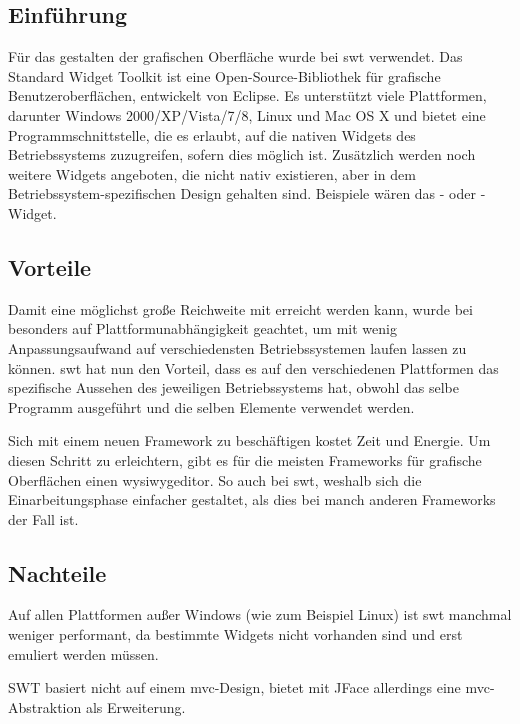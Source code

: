 \subsection{Einführung}
Für das gestalten der grafischen Oberfläche wurde bei \sblit \acrshort{swt} verwendet.
Das Standard Widget Toolkit ist eine Open-Source-Bibliothek für grafische
Benutzeroberflächen, entwickelt von Eclipse. Es unterstützt viele Plattformen,
darunter Windows 2000/XP/Vista/7/8, Linux und Mac OS X und bietet eine
Programmschnittstelle, die es erlaubt, auf die nativen Widgets des
Betriebssystems zuzugreifen, sofern dies möglich ist. Zusätzlich werden noch
weitere Widgets angeboten, die nicht nativ existieren, aber in dem
Betriebssystem-spezifischen Design gehalten sind. Beispiele wären das -
oder -Widget.\cite{swt:tutorial}

\subsection{Vorteile}
\begin{description}
    Damit eine möglichst große Reichweite mit \sblit erreicht werden kann, wurde bei
    besonders auf Plattformunabhängigkeit geachtet, um \sblit mit wenig
    Anpassungsaufwand auf verschiedensten Betriebssystemen laufen lassen zu können.
		\acrshort{swt} hat nun den Vorteil, dass es auf den verschiedenen Plattformen das
    spezifische Aussehen des jeweiligen Betriebssystems hat, obwohl das selbe
    Programm ausgeführt und die selben Elemente verwendet werden.

    Sich mit einem neuen Framework zu beschäftigen kostet Zeit und Energie. Um
    diesen Schritt zu erleichtern, gibt es für die meisten Frameworks für grafische
    Oberflächen einen \gls{wysiwygeditor}. So auch bei \acrshort{swt}, weshalb
    sich die Einarbeitungsphase einfacher gestaltet, als dies bei manch anderen Frameworks
    der Fall ist.
\end{description}

\subsection{Nachteile}
\begin{description}
    Auf allen Plattformen außer Windows (wie zum Beispiel Linux) ist \acrshort{swt} manchmal
    weniger performant, da bestimmte Widgets nicht vorhanden sind und erst emuliert werden müssen.\cite{swt:disadvantages}

    SWT basiert nicht auf einem \acrshort{mvc}-Design, bietet mit JFace allerdings eine
    \acrshort{mvc}-Abstraktion als Erweiterung.\cite{swt:disadvantages}
\end{description}

